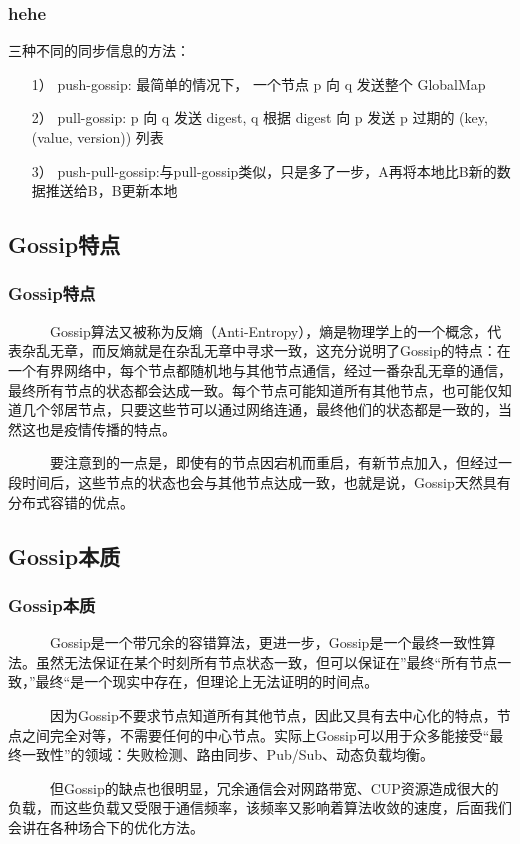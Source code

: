 \documentclass[slidestop,compress,mathserif,c]{beamer}
\begin{document}
\begin{frame}
\frametitle{hehe}
 三种不同的同步信息的方法：
 \begin{itemize}
\item[1）]push-gossip: 最简单的情况下， 一个节点 p 向 q 发送整个 GlobalMap
\item[2）]pull-gossip: p 向 q 发送 digest, q 根据 digest 向 p 发送 p 过期的 (key, (value, version)) 列表
\item[3）]push-pull-gossip:与pull-gossip类似，只是多了一步，A再将本地比B新的数据推送给B，B更新本地 
 \end{itemize}
\end{frame}


\subsection{\hfill Gossip特点}
\begin{frame}
\frametitle{Gossip特点}
~~~~~~Gossip算法又被称为反熵（Anti-Entropy），熵是物理学上的一个概念，代表杂乱无章，而反熵就是在杂乱无章中寻求一致，这充分说明了Gossip的特点：在一个有界网络中，每个节点都随机地与其他节点通信，经过一番杂乱无章的通信，最终所有节点的状态都会达成一致。每个节点可能知道所有其他节点，也可能仅知道几个邻居节点，只要这些节可以通过网络连通，最终他们的状态都是一致的，当然这也是疫情传播的特点。

~~~~~~要注意到的一点是，即使有的节点因宕机而重启，有新节点加入，但经过一段时间后，这些节点的状态也会与其他节点达成一致，也就是说，Gossip天然具有分布式容错的优点。
\end{frame}

\subsection{\hfill Gossip本质}
\begin{frame}
\frametitle{Gossip本质}
~~~~~~Gossip是一个带冗余的容错算法，更进一步，Gossip是一个最终一致性算法。虽然无法保证在某个时刻所有节点状态一致，但可以保证在”最终“所有节点一致，”最终“是一个现实中存在，但理论上无法证明的时间点。

~~~~~~因为Gossip不要求节点知道所有其他节点，因此又具有去中心化的特点，节点之间完全对等，不需要任何的中心节点。实际上Gossip可以用于众多能接受“最终一致性”的领域：失败检测、路由同步、Pub/Sub、动态负载均衡。

~~~~~~但Gossip的缺点也很明显，冗余通信会对网路带宽、CUP资源造成很大的负载，而这些负载又受限于通信频率，该频率又影响着算法收敛的速度，后面我们会讲在各种场合下的优化方法。
\end{frame}
\end{document}
